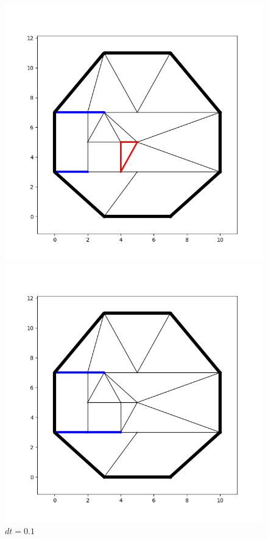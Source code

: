 \documentclass[10pt]{article}
\begin{document}
\begin{figure}[H]
    \centering
    \begin{minipage}{.4\linewidth}
        \centering
        \includegraphics[width=1\textwidth]{images/Figure_7.png}
        \caption{$dt=0.1$}
        \label{fig:prob1_6_2}
    \end{minipage}%
    \begin{minipage}{.4\linewidth}
        \centering
        \includegraphics[width=1\textwidth]{images/Figure_8.png}
        \caption{$dt=0.1$}
        \label{fig:prob1_6_2}
    \end{minipage}
\end{figure}
\end{document}
